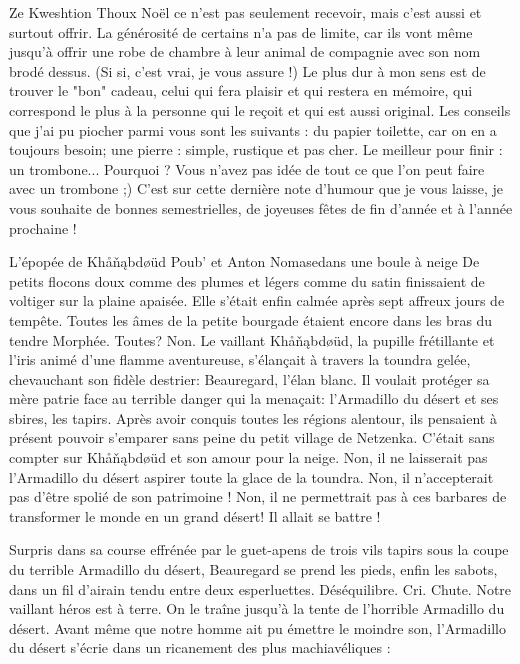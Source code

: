 \begin{spacing}{.94}
\begin{article}{Ze Kweshtion Thoux}
Noël ce n'est pas seulement recevoir, mais c'est aussi et surtout offrir. La générosité de certains n'a pas de limite, car ils vont même jusqu'à offrir une robe de chambre à leur animal de compagnie avec son nom brodé dessus. (Si si, c'est vrai, je vous assure !)
Le plus dur à mon sens est de trouver le "bon" cadeau, celui qui fera plaisir et qui restera en mémoire, qui correspond le plus à la personne qui le reçoit et qui est aussi original. Les conseils que j’ai pu piocher parmi vous sont les suivants : du papier toilette, car on en a toujours besoin; une pierre : simple, rustique et pas cher. Le meilleur pour finir : un trombone... Pourquoi ? Vous n’avez pas idée de tout ce que l’on peut faire avec un trombone ;)
C’est sur cette dernière note d’humour que je vous laisse, je vous souhaite de bonnes semestrielles, de joyeuses fêtes de fin d’année et à l'année prochaine !
\end{article}
\ligne
\begin{article}{L'épopée de Khåňąbdøüd}
{Poub' et Anton Nomase}{dans une boule à neige}
De petits flocons doux comme des plumes et légers comme du satin finissaient de voltiger sur la plaine apaisée. Elle s’était enfin calmée après sept affreux jours de tempête. Toutes les âmes de la petite bourgade étaient encore dans les bras du tendre Morphée. Toutes? Non. Le vaillant Khåňąbdøüd, la pupille frétillante et l'iris animé d'une flamme aventureuse, s'élançait à travers la toundra gelée, chevauchant son fidèle destrier: Beauregard, l'élan blanc.
Il voulait protéger sa mère patrie face au terrible danger qui la menaçait: l'Armadillo du désert et ses sbires, les tapirs. Après avoir conquis toutes les régions alentour, ils pensaient à présent pouvoir s'emparer sans peine du petit village de Netzenka. C'était sans compter sur Khåňąbdøüd et son amour pour la neige. Non, il ne laisserait pas l'Armadillo du désert aspirer toute la glace de la toundra. Non, il n'accepterait pas d'être spolié de son patrimoine ! Non, il ne permettrait pas à ces barbares de transformer le monde en un grand désert! Il allait se battre !

Surpris dans sa course effrénée par le guet-apens de trois vils tapirs sous la coupe du terrible Armadillo du désert, Beauregard se prend les pieds, enfin les sabots, dans un fil d’airain tendu entre deux esperluettes. Déséquilibre. Cri. Chute. Notre vaillant héros est à terre. On le traîne jusqu'à la tente de l'horrible Armadillo du désert. Avant même que notre homme ait pu émettre le moindre son, l'Armadillo du désert s’écrie dans un ricanement des plus machiavéliques :


\end{article}
\end{spacing}
